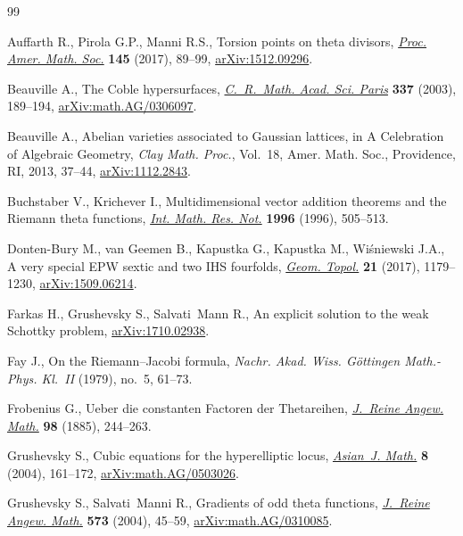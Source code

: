 \documentclass[pdftex]{sigma}
\numberwithin{equation}{section}
\begin{document}
\begin{thebibliography}{99}
\footnotesize\itemsep=0pt

Auffarth R., Pirola G.P., Manni R.S., Torsion points on theta divisors,
 \href{https://doi.org/10.1090/proc/13230}{\textit{Proc. Amer. Math. Soc.}} \textbf{145} (2017), 89--99,
 \href{https://arxiv.org/abs/1512.09296}{arXiv:1512.09296}.

Beauville A., The {C}oble hypersurfaces, \href{https://doi.org/10.1016/S1631-073X(03)00302-9}{\textit{C.~R.~Math. Acad. Sci. Paris}}
 \textbf{337} (2003), 189--194, \href{https://arxiv.org/abs/math.AG/0306097}{arXiv:math.AG/0306097}.

Beauville A., Abelian varieties associated to {G}aussian lattices, in A
 Celebration of Algebraic Geometry, \textit{Clay Math. Proc.}, Vol.~18, Amer.
 Math. Soc., Providence, RI, 2013, 37--44, \href{https://arxiv.org/abs/1112.2843}{arXiv:1112.2843}.

Buchstaber V., Krichever I., Multidimensional vector addition theorems and the
 {R}iemann theta functions, \href{https://doi.org/10.1155/S1073792896000347}{\textit{Int. Math. Res. Not.}} \textbf{1996}
 (1996), 505--513.

Donten-Bury M., van Geemen B., Kapustka G., Kapustka M., Wi\'sniewski J.A., A
 very special {EPW} sextic and two {IHS} fourfolds, \href{https://doi.org/10.2140/gt.2017.21.1179}{\textit{Geom. Topol.}}
 \textbf{21} (2017), 1179--1230, \href{https://arxiv.org/abs/1509.06214}{arXiv:1509.06214}.

Farkas H., Grushevsky S., Salvati~Mann R., An explicit solution to the weak
 Schottky problem, \href{https://arxiv.org/abs/1710.02938}{arXiv:1710.02938}.

Fay J., On the {R}iemann--{J}acobi formula, \textit{Nachr. Akad. Wiss.
 G\"{o}ttingen Math.-Phys. Kl.~II} (1979), no.~5, 61--73.

Frobenius G., Ueber die constanten {F}actoren der {T}hetareihen,
 \href{https://doi.org/10.1515/crll.1885.98.244}{\textit{J.~Reine Angew. Math.}} \textbf{98} (1885), 244--263.

Grushevsky S., Cubic equations for the hyperelliptic locus, \href{https://doi.org/10.4310/AJM.2004.v8.n1.a12}{\textit{Asian~J.
 Math.}} \textbf{8} (2004), 161--172, \href{https://arxiv.org/abs/math.AG/0503026}{arXiv:math.AG/0503026}.

Grushevsky S., Salvati~Manni R., Gradients of odd theta functions,
 \href{https://doi.org/10.1515/crll.2004.063}{\textit{J.~Reine Angew. Math.}} \textbf{573} (2004), 45--59,
 \href{https://arxiv.org/abs/math.AG/0310085}{arXiv:math.AG/0310085}.


\end{thebibliography}
\end{document}
